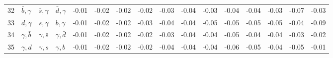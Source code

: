 \begin{tabularx}{\textwidth}{rXXX@{}S@{}S@{}S@{}S@{}S@{}S@{}S@{}S@{}S@{}S@{}S@{}S}
 32 & $\bar b,\gamma$  & $\bar s,\gamma$  & $\bar d,\gamma$ & -0.01 & -0.02 & -0.02 & -0.02 & -0.03 & -0.04 & -0.03 & -0.04 & -0.04 & -0.03 & -0.07 & -0.03 \\
 33 & $d,\gamma$       & $s,\gamma$       & $b,\gamma$      & -0.01 & -0.02 & -0.02 & -0.03 & -0.04 & -0.04 & -0.05 & -0.05 & -0.05 & -0.05 & -0.04 & -0.09 \\
 34 & $\gamma,\bar b$  & $\gamma,\bar s$  & $\gamma,\bar d$ & -0.01 & -0.02 & -0.02 & -0.02 & -0.03 & -0.04 & -0.04 & -0.05 & -0.04 & -0.04 & -0.03 & -0.02 \\
 35 & $\gamma,d$       & $\gamma,s$       & $\gamma, b$     & -0.01 & -0.02 & -0.02 & -0.02 & -0.04 & -0.04 & -0.04 & -0.06 & -0.05 & -0.04 & -0.05 & -0.01 \\ 
 \bottomrule
\end{tabularx}
